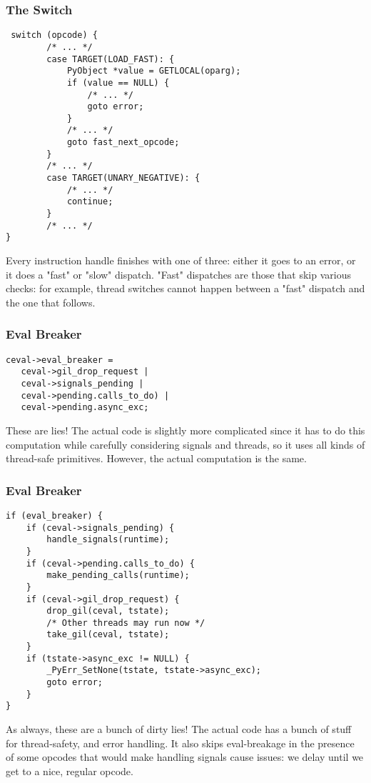 \begin{frame}[fragile]
\frametitle{The Switch}
\begin{lstlisting}
 switch (opcode) {
        /* ... */
        case TARGET(LOAD_FAST): {
            PyObject *value = GETLOCAL(oparg);
            if (value == NULL) {
                /* ... */
                goto error;
            }
            /* ... */
            goto fast_next_opcode;
        }
        /* ... */
        case TARGET(UNARY_NEGATIVE): {
            /* ... */
            continue;
        }
        /* ... */
}
\end{lstlisting}
\end{frame}

Every instruction handle finishes with one of three:
either it goes to an error, or it does a
"fast"
or
"slow"
dispatch.
"Fast" dispatches are those that skip various checks:
for example,
thread switches cannot happen between a "fast" dispatch
and the one that follows.

\begin{frame}[fragile]
\frametitle{Eval Breaker}
\begin{lstlisting}
ceval->eval_breaker = 
   ceval->gil_drop_request |
   ceval->signals_pending | 
   ceval->pending.calls_to_do) | 
   ceval->pending.async_exc;
\end{lstlisting}
\end{frame}

These are lies!
The actual code is slightly more complicated since it has to
do this computation while carefully considering signals and threads,
so it uses all kinds of thread-safe primitives.
However, the actual computation is the same.

\begin{frame}[fragile]
\frametitle{Eval Breaker}
\begin{lstlisting}
if (eval_breaker) {
    if (ceval->signals_pending) {
        handle_signals(runtime);
    }
    if (ceval->pending.calls_to_do) {
        make_pending_calls(runtime);
    }
    if (ceval->gil_drop_request) {
        drop_gil(ceval, tstate);
        /* Other threads may run now */
        take_gil(ceval, tstate);
    }
    if (tstate->async_exc != NULL) {
        _PyErr_SetNone(tstate, tstate->async_exc);
        goto error;
    }
}
\end{lstlisting}
\end{frame}

As always,
these are a bunch of dirty lies!
The actual code has a bunch of stuff for thread-safety,
and error handling.
It also skips eval-breakage in the presence of some opcodes
that would make handling signals cause issues:
we delay until we get to a nice,
regular opcode.

